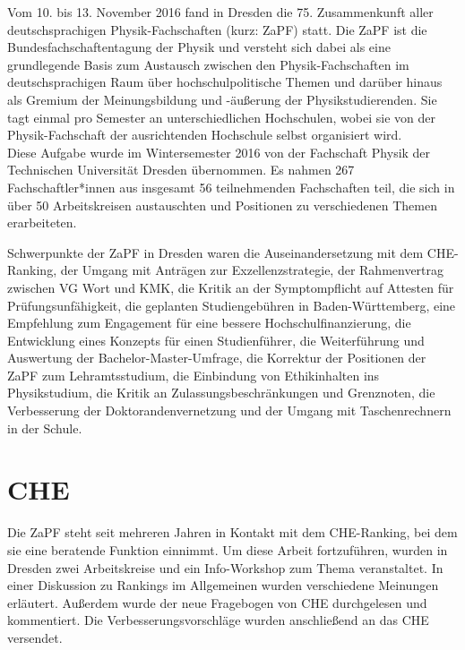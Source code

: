 Vom 10. bis 13. November 2016 fand in Dresden die 75. Zusammenkunft
aller deutschsprachigen Physik-Fachschaften (kurz: ZaPF) statt.  Die ZaPF ist
die Bundesfachschaftentagung der Physik und versteht sich dabei als eine
grundlegende Basis zum Austausch zwischen den Physik-Fachschaften im
deutschsprachigen Raum über hochschulpolitische Themen und darüber hinaus als
Gremium der Meinungsbildung und -äußerung der Physikstudierenden. Sie tagt
einmal pro Semester an unterschiedlichen Hochschulen, wobei sie von der
Physik-Fachschaft der ausrichtenden Hochschule selbst organisiert wird. \\

Diese Aufgabe wurde im Wintersemester 2016 von der Fachschaft Physik der Technischen Universität Dresden übernommen. 
Es nahmen 267 Fachschaftler*innen aus insgesamt 56 teilnehmenden Fachschaften teil, 
die sich in über 50 Arbeitskreisen austauschten und Positionen zu verschiedenen Themen erarbeiteten.

Schwerpunkte der ZaPF in Dresden waren die Auseinandersetzung mit dem CHE-Ranking, der Umgang mit Anträgen zur Exzellenzstrategie, der Rahmenvertrag zwischen VG Wort und KMK, 
die Kritik an der Symptompflicht auf Attesten für Prüfungsunfähigkeit, die geplanten Studiengebühren in Baden-Württemberg, 
eine Empfehlung zum Engagement für eine bessere Hochschulfinanzierung, die Entwicklung eines Konzepts für einen Studienführer, 
die Weiterführung und Auswertung der Bachelor-Master-Umfrage, die Korrektur der Positionen der ZaPF zum Lehramtsstudium, die Einbindung von Ethikinhalten ins Physikstudium, 
die Kritik an Zulassungsbeschränkungen und Grenznoten, die Verbesserung der Doktorandenvernetzung und der Umgang mit Taschenrechnern in der Schule.

\newpage

\section*{CHE}
Die ZaPF steht seit mehreren Jahren in Kontakt mit dem CHE-Ranking, bei dem sie eine beratende Funktion einnimmt. Um diese Arbeit fortzuführen, wurden in Dresden 
zwei Arbeitskreise und ein Info-Workshop zum Thema veranstaltet. In einer Diskussion zu Rankings im Allgemeinen wurden verschiedene Meinungen erläutert. 
Außerdem wurde der neue Fragebogen von CHE durchgelesen und kommentiert. Die Verbesserungsvorschläge wurden anschließend an das CHE versendet.

